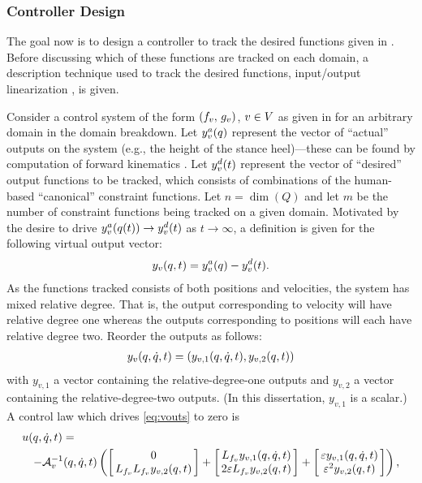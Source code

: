 \subsubsection{Controller Design}

The goal now is to design a controller to track the desired functions given in
.
%
Before discussing which of these functions are tracked on each domain, a
description technique used to track the desired functions, input/output
linearization \cite[Ch.~9]{Sastry1999}, is given. %

Consider a control system of the form $(f_{v}, \, g_{v})$, $v \in V$ as given in
 for an arbitrary domain in the domain breakdown.
%
Let $y^{a}_{v}(q)$ represent the vector of ``actual'' outputs on the system
(e.g., the height of the stance heel)---these can be found by computation of
forward kinematics \cite{Murray1994}.
%
Let $y^{d}_{v}(t)$ represent the vector of ``desired'' output functions to be
tracked, which consists of combinations of the human-based ``canonical''
constraint functions.
%
Let $n = \dim(Q)$ and let $m$ be the number of constraint functions being
tracked on a given domain.
%
Motivated by the desire to drive $y^{a}_{v}(q(t)) \to y^{d}_{v}(t)$ as $t
\to \infty$, a definition is given for the following virtual output vector:
%
\begin{align}
  \label{eq:virtout}
  y_v(q, t) = y^a_v(q) - y^d_v(t).
\end{align}
As the functions tracked consists of both positions and velocities, the system
has mixed relative degree.
%
That is, the output corresponding to velocity will have relative degree one
whereas the outputs corresponding to positions will each have relative degree
two.
%
Reorder the outputs as follows:
\begin{align}
  \label{eq:vouts}
  y_v(q, \dot{q}, t) = (y_{v,1}(q, \dot{q}, t), y_{v,2}(q, t))
\end{align}
with $y_{v,1}$ a vector containing the relative-degree-one outputs and $y_{v,2}$
a vector containing the relative-degree-two outputs.
%
(In this dissertation, $y_{v,1}$ is a scalar.)
%
A control law which drives \eqref{eq:vouts} to zero is
\begin{align*}
  \lefteqn{u(\q, \dq, t) = }\\
  &&-\mathcal{A}_{v}^{-1}(\q, \dq, t)
  \left(\left[\!\!\begin{array}{c}
      0\\
      L_{\xfv} L_{\xfv} y_{v,2}(\q, t)
    \end{array}\!\!\right]
  + \left[\!\!\begin{array}{c}
      L_{\xfv} y_{v,1}(\q, \dq, t)\\
      2 \varepsilon L_{\xfv} y_{v,2}(\q, t)
    \end{array}\!\!\right] +
  \left[\!\!\begin{array}{c}
      \varepsilon y_{v,1}(\q, \dq, t)\\
      \varepsilon^2 y_{v,2}(\q, t)
    \end{array}\!\!\right]\right),
\end{align*}
